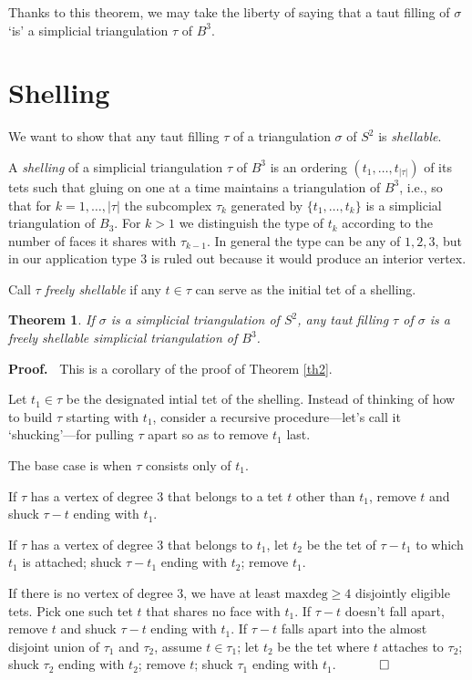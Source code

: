 \documentclass[12pt]{article}
\newtheorem{theorem}{Theorem}
\newcommand{\proofstart}{{\noindent \bf Proof.\ }}
\newcommand{\proofend}{$\quad \qed$}
\newcommand{\kw}{\mathrm}
\newcommand{\maxdeg}{\kw{maxdeg}}
\begin{document}
Thanks to this theorem, we may take the liberty of saying that
a taut filling of $\sigma$ `is' a simplicial triangulation
$\tau$ of $B^3$.

\section{Shelling}

We want to show that any taut filling $\tau$ of a triangulation $\sigma$
of $S^2$ is \emph{shellable}.

A \emph{shelling} of a simplicial triangulation $\tau$ of $B^3$
is an ordering 
$(t_1,\ldots,t_{|\tau|})$
of its tets such that
gluing on one at a time maintains a triangulation of $B^3$,
i.e., 
so that for $k=1,\ldots,|\tau|$ the subcomplex $\tau_k$ generated
by $\{t_1,\ldots,t_k\}$ is a simplicial triangulation of $B_3$.
For $k>1$ we distinguish the type of $t_k$ according to the number of
faces it shares with $\tau_{k-1}$.
In general the type can be any of $1,2,3$, but in our application
type $3$ is ruled out because it would produce an interior vertex.

Call $\tau$ \emph{freely shellable} if any $t \in \tau$
can serve as the initial tet of a shelling.

\begin{theorem} \label{th3}
If $\sigma$ is a simplicial triangulation of $S^2$,
any taut filling $\tau$ of $\sigma$
is a freely shellable
simplicial triangulation of $B^3$.
\end{theorem}

\proofstart
This is a corollary of the proof of Theorem \ref{th2}.

Let $t_1 \in \tau$ be the designated intial tet of the shelling.
Instead of thinking of how to build $\tau$ starting with $t_1$,
consider a recursive procedure---let's call it `shucking'---for
pulling $\tau$ apart so as to remove $t_1$ last.

The base case is when $\tau$ consists only of $t_1$.

If $\tau$ has a vertex of degree 3 that belongs to a tet $t$
other than $t_1$, remove $t$ and shuck $\tau-t$ ending with $t_1$.

If $\tau$ has a vertex of degree 3 that belongs to $t_1$,
let $t_2$ be the tet of $\tau-t_1$ to which $t_1$ is attached;
shuck $\tau-t_1$ ending with $t_2$;
remove $t_1$.

If there is no vertex of degree 3,
we have at least $\maxdeg \geq 4$ disjointly eligible tets.
Pick one such tet $t$ that shares no face with $t_1$.
If $\tau-t$ doesn't fall apart,
remove $t$ and shuck $\tau-t$ ending with $t_1$.
If $\tau-t$ falls apart
into the almost disjoint union of $\tau_1$ and $\tau_2$,
assume $t \in \tau_1$;
let $t_2$ be the tet where $t$ attaches to $\tau_2$;
shuck $\tau_2$ ending with $t_2$;
remove $t$;
shuck $\tau_1$ ending with $t_1$.
\proofend
\end{document}
